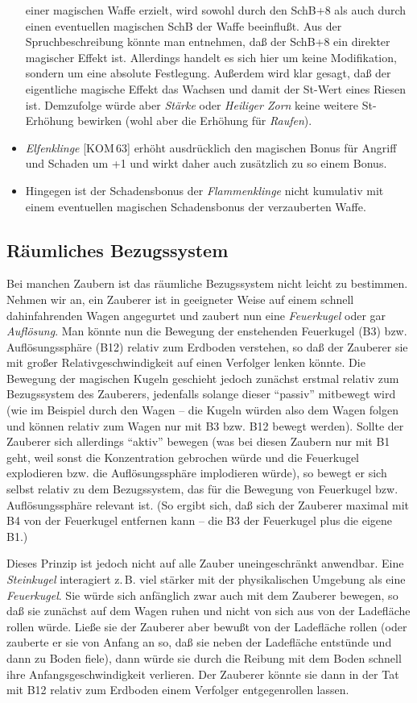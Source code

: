 \documentclass[10pt,a4paper,germanpar]{article}
\begin{document}
\begin{itemize}
  einer magischen Waffe erzielt, wird sowohl durch den SchB+8 als auch
  durch einen eventuellen magischen SchB der Waffe beeinflußt. Aus der
  Spruchbeschreibung könnte man entnehmen, daß der SchB+8 ein direkter
  magischer Effekt ist. Allerdings handelt es sich hier um keine
  Modifikation, sondern um eine absolute Festlegung. Außerdem wird
  klar gesagt, daß der eigentliche magische Effekt das Wachsen und
  damit der St-Wert eines Riesen ist. Demzufolge würde aber
  \emph{Stärke} oder \emph{Heiliger Zorn} keine weitere St-Erhöhung
  bewirken (wohl aber die Erhöhung für \emph{Raufen}).
\item \emph{Elfenklinge} [KOM\,63] erhöht ausdrücklich den magischen
  Bonus für Angriff und Schaden um +1 und wirkt daher auch zusätzlich
  zu so einem Bonus.
\item Hingegen ist der Schadensbonus der \emph{Flammenklinge} nicht
  kumulativ mit einem eventuellen magischen Schadensbonus der
  verzauberten Waffe.
\end{itemize}

\subsection{Räumliches Bezugssystem}

Bei manchen Zaubern ist das räumliche Bezugssystem nicht leicht zu
bestimmen. Nehmen wir an, ein Zauberer ist in geeigneter Weise auf
einem schnell dahinfahrenden Wagen angegurtet und zaubert nun eine
\emph{Feuerkugel} oder gar \emph{Auflösung}. Man könnte nun die
Bewegung der enstehenden Feuerkugel (B3) bzw. Auflösungssphäre (B12)
relativ zum Erdboden verstehen, so daß der Zauberer sie mit großer
Relativgeschwindigkeit auf einen Verfolger lenken könnte. Die Bewegung
der magischen Kugeln geschieht jedoch zunächst erstmal relativ zum
Bezugssystem des Zauberers, jedenfalls solange dieser "`passiv"'
mitbewegt wird (wie im Beispiel durch den Wagen -- die Kugeln würden
also dem Wagen folgen und können relativ zum Wagen nur mit B3 bzw. B12
bewegt werden). Sollte der Zauberer sich allerdings "`aktiv"' bewegen
(was bei diesen Zaubern nur mit B1 geht, weil sonst die Konzentration
gebrochen würde und die Feuerkugel explodieren bzw. die
Auflösungssphäre implodieren würde), so bewegt er sich selbst relativ
zu dem Bezugssystem, das für die Bewegung von Feuerkugel
bzw. Auflösungssphäre relevant ist. (So ergibt sich, daß sich der
Zauberer maximal mit B4 von der Feuerkugel entfernen kann -- die B3
der Feuerkugel plus die eigene B1.)

Dieses Prinzip ist jedoch nicht auf alle Zauber uneingeschränkt
anwendbar. Eine \emph{Steinkugel} interagiert z.\,B. viel stärker mit
der physikalischen Umgebung als eine \emph{Feuerkugel}. Sie würde
sich anfänglich zwar auch mit dem Zauberer bewegen, so daß sie
zunächst auf dem Wagen ruhen und nicht von sich aus von der
Ladefläche rollen würde. Ließe sie der Zauberer aber bewußt von der
Ladefläche rollen (oder zauberte er sie von Anfang an so, daß sie
neben der Ladefläche entstünde und dann zu Boden fiele), dann würde
sie durch die Reibung mit dem Boden schnell ihre
Anfangsgeschwindigkeit verlieren. Der Zauberer könnte sie dann in der
Tat mit B12 relativ zum Erdboden einem Verfolger entgegenrollen
lassen.
\end{document}
